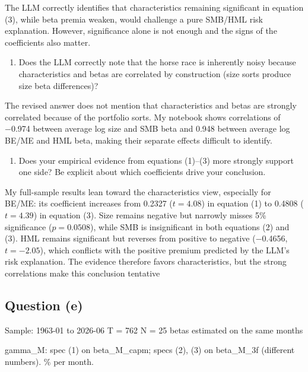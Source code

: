 \documentclass[11pt,letterpaper]{article}
\providecommand{\tightlist}{\setlength{\itemsep}{0pt}\setlength{\parskip}{0pt}}
\begin{document}
The LLM correctly identifies that characteristics remaining significant in equation (3), while beta premia weaken, would challenge a pure SMB/HML risk explanation. However, significance alone is not enough and the signs of the coefficients also matter.

\begin{enumerate}
\def\labelenumi{\arabic{enumi}.}
\setcounter{enumi}{1}
\tightlist
\item
  Does the LLM correctly note that the horse race is inherently noisy because characteristics and betas are correlated by construction (size sorts produce size beta differences)?
\end{enumerate}

The revised answer does not mention that characteristics and betas are strongly correlated because of the portfolio sorts. My notebook shows correlations of −0.974 between average log size and SMB beta and 0.948 between average log BE/ME and HML beta, making their separate effects difficult to identify.

\begin{enumerate}
\def\labelenumi{\arabic{enumi}.}
\setcounter{enumi}{2}
\tightlist
\item
  Does your empirical evidence from equations (1)--(3) more strongly support one side? Be explicit about which coefficients drive your conclusion.
\end{enumerate}

My full-sample results lean toward the characteristics view, especially for BE/ME: its coefficient increases from 0.2327 (\(t=4.08\)) in equation (1) to 0.4808 (\(t=4.39\)) in equation (3). Size remains negative but narrowly misses 5\% significance (\(p=0.0508\)), while SMB is insignificant in both equations (2) and (3). HML remains significant but reverses from positive to negative (−0.4656, \(t=-2.05\)), which conflicts with the positive premium predicted by the LLM's risk explanation. The evidence therefore favors characteristics, but the strong correlations make this conclusion tentative

\hypertarget{question-e}{%
\subsection{Question (e)}\label{question-e}}

Sample: 1963-01 to 2026-06 \textbar{} T = 762 \textbar{} N = 25 \textbar{} betas estimated on the same months

gamma\_M: spec (1) on beta\_M\_capm; specs (2), (3) on beta\_M\_3f (different numbers). \% per month.
\end{document}
